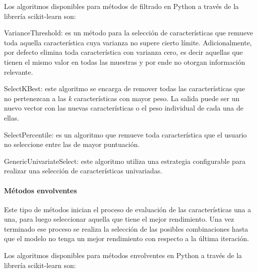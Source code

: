 Los algoritmos disponibles para métodos de filtrado en Python a través de la librería scikit-learn \parencite{sklearn_api} son:
 
 \begin{APAitemize}
     \item VarianceThreshold: es un método para la selección de características que remueve toda aquella característica cuya varianza no supere cierto límite. Adicionalmente, por defecto elimina toda característica con varianza cero, es decir aquellas que tienen el mismo valor en todas las muestras y por ende no otorgan información relevante.
     \item SelectKBest: este algoritmo se encarga de remover todas las características que no pertenezcan a las \textit{k} características con mayor peso. La salida puede ser un nuevo vector con las nuevas características o el peso individual de cada una de ellas.
     \item SelectPercentile: es un algoritmo que remueve toda característica que el usuario no seleccione entre las de mayor puntuación.
     \item GenericUnivariateSelect: este algoritmo utiliza una estrategia configurable para realizar una selección de características univariadas.
 \end{APAitemize}
 
\paragraph{Métodos envolventes} Este tipo de métodos inician el proceso de evaluación de las características una a una, para luego seleccionar aquella que tiene el mejor rendimiento. Una vez terminado ese proceso se realiza la selección de las posibles combinaciones hasta que el modelo no tenga un mejor rendimiento con respecto a la última iteración. 
 
Los algoritmos disponibles para métodos envolventes en Python a través de la librería scikit-learn \parencite{sklearn_api} son:
 
